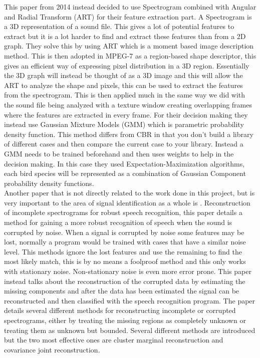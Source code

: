 This paper from 2014 \cite{danne1} instead decided to use Spectrogram combined with
Angular and Radial Transform (ART) for their feature extraction part. A
Spectrogram is a 3D representation of a sound file. This gives a lot of
potential features to extract but it is a lot harder to find and extract
these features than from a 2D graph. They solve this by using ART which is a
moment based image description method. This is then adopted in MPEG-7 as a
region-based shape descriptor, this gives an efficient way of expressing pixel
distribution in a 3D region. Essentially the 3D graph will instead be thought
of as a 3D image and this will allow the ART to analyze the shape and pixels,
this can be used to extract the features from the spectrogram. This is then
applied much in the same way we did with the sound file being analyzed with a
texture window creating overlapping frames where the features are extracted in
every frame. For their decision making they instead use Gaussian Mixture Models
(GMM) which is parametric probability density function. This method differs
from CBR in that you don't build a library of different cases and then compare
the current case to your library. Instead a GMM needs to be trained beforehand
and then uses weights to help in the decision making. In this case they used
Expectation-Maximization algorithms, each bird species will be represented as
a combination of Gaussian Component probability density functions.\\

Another paper that is not directly related to the work done in this project,
but is very important to the area of signal identification as a whole is \cite{1566472}.
Reconstruction of incomplete spectrograms for robust speech recognition, this
paper details a method for gaining a more robust recognition of speech when the
sound is corrupted by noise. When a signal is corrupted by noise some features
may be lost, normally a program would be trained with cases that have a similar
noise level. This methods ignore the lost features and use the remaining to
find the most likely match, this is by no means a foolproof method and this
only works with stationary noise. Non-stationary noise is even more error prone.
 This paper instead talks about the reconstruction of the corrupted data by
 estimating the missing components and after the data has been estimated the
 signal can be reconstructed and then classified with the speech recognition
 program. The paper details several different methods for reconstructing
 incomplete or corrupted spectrograms, either by treating the missing regions
 as completely unknown or treating them as unknown but bounded. Several
 different methods are introduced but the two most effective ones are cluster
 marginal reconstruction and covariance joint reconstruction.\\
